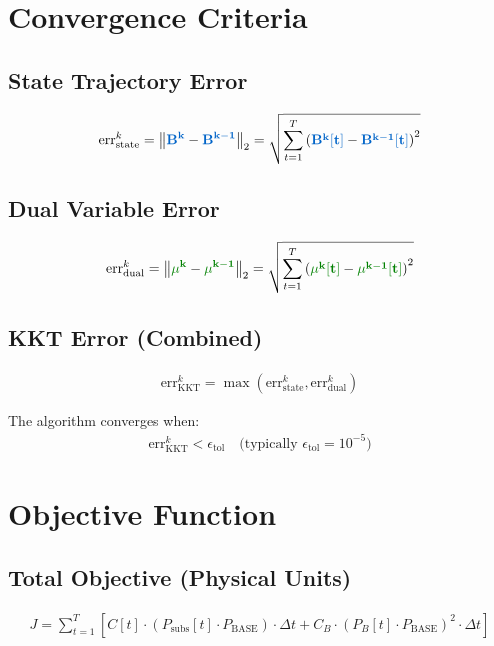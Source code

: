 \documentclass[11pt]{article}
\newcommand{\blueB}[1]{\textcolor{bluevar}{\mathbf{#1}}}      %
\newcommand{\greenmu}[1]{\textcolor{greenvar}{\mathbf{#1}}}   %
\begin{document}
\section{Convergence Criteria}

\subsection{State Trajectory Error}
\begin{align}
\text{err}_{\text{state}}^k = \left\| \blueB{B^k} - \blueB{B^{k-1}} \right\|_2 = \sqrt{\sum_{t=1}^T \left( \blueB{B^k[t]} - \blueB{B^{k-1}[t]} \right)^2}
\end{align}

\subsection{Dual Variable Error}
\begin{align}
\text{err}_{\text{dual}}^k = \left\| \greenmu{\mu^k} - \greenmu{\mu^{k-1}} \right\|_2 = \sqrt{\sum_{t=1}^T \left( \greenmu{\mu^k[t]} - \greenmu{\mu^{k-1}[t]} \right)^2}
\end{align}

\subsection{KKT Error (Combined)}
\begin{align}
\text{err}_{\text{KKT}}^k = \max\left( \text{err}_{\text{state}}^k, \text{err}_{\text{dual}}^k \right)
\end{align}

The algorithm converges when:
\begin{align}
\text{err}_{\text{KKT}}^k < \epsilon_{\text{tol}} \quad \text{(typically } \epsilon_{\text{tol}} = 10^{-5}\text{)}
\end{align}

\section{Objective Function}

\subsection{Total Objective (Physical Units)}
\begin{align}
J = \sum_{t=1}^T \left[ C[t] \cdot (P_{\text{subs}}[t] \cdot P_{\text{BASE}}) \cdot \Delta t + C_B \cdot (P_B[t] \cdot P_{\text{BASE}})^2 \cdot \Delta t \right]
\end{align}
\end{document}

